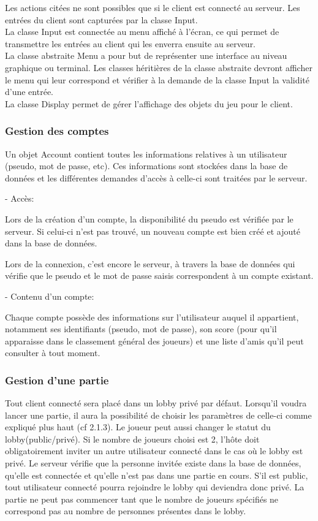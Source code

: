 \documentclass[a4paper,12pt]{article}
\begin{document}
Les actions citées ne sont possibles que si le client est connecté au serveur. Les entrées du client sont capturées par la classe Input.\\
La classe Input est connectée au menu affiché à l'écran, ce qui permet de transmettre les entrées au client qui les enverra ensuite au serveur.\\
La classe abstraite Menu a pour but de représenter une interface au niveau graphique ou terminal. Les classes héritières de la classe abstraite devront afficher le menu qui leur correspond et vérifier à la demande de la classe Input la validité d'une entrée.\\
La classe Display permet de gérer l'affichage des objets du jeu pour le client.


\subsubsection{Gestion des comptes}
Un objet Account contient toutes les informations relatives à un utilisateur (pseudo, mot de passe, etc). Ces informations sont stockées dans la base de données et les différentes demandes d'accès à celle-ci sont traitées par le serveur.

- Accès:

Lors de la création d'un compte, la disponibilité du pseudo est vérifiée par le serveur. Si celui-ci n'est pas trouvé, un nouveau compte est bien créé et ajouté dans la base de données.

Lors de la connexion, c'est encore le serveur, à travers la base de données qui vérifie que le pseudo et le mot de passe saisis correspondent à un compte existant.

- Contenu d'un compte:

Chaque compte possède des informations sur l'utilisateur auquel il appartient, notamment ses identifiants (pseudo, mot de passe), son score (pour qu'il apparaisse dans le classement général des joueurs) et une liste d'amis qu'il peut consulter à tout moment.

\subsubsection{Gestion d'une partie}

Tout client connecté sera placé dans un lobby privé par défaut. Lorsqu'il voudra lancer une partie,
il aura la possibilité de choisir les paramètres de celle-ci comme expliqué plus haut (cf 2.1.3). Le joueur peut aussi changer le statut du lobby(public/privé). Si le nombre de joueurs choisi est 2, l'hôte doit obligatoirement inviter un autre utilisateur connecté dans le cas où le lobby est privé.
Le serveur vérifie que la personne invitée existe dans la base de données, qu'elle est connectée et qu'elle n'est pas dans une partie en cours.
S'il est public, tout utilisateur connecté pourra rejoindre le lobby qui deviendra donc privé.
La partie ne peut pas commencer tant que le nombre de joueurs spécifiés ne correspond pas au nombre de personnes présentes dans le lobby.
\end{document}
